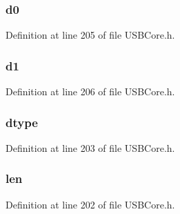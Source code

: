 \subsubsection[{d0}]{ d0}\label{struct_c_d_c_c_s_interface_descriptor_a3e359aaf0f33f4eeedb3f26e73ac1cc7}


Definition at line 205 of file U\+S\+B\+Core.\+h.

\hypertarget{struct_c_d_c_c_s_interface_descriptor_ac1f3ea17c85c96dbc7ec1dba968be24f}{}
\subsubsection[{d1}]{ d1}\label{struct_c_d_c_c_s_interface_descriptor_ac1f3ea17c85c96dbc7ec1dba968be24f}


Definition at line 206 of file U\+S\+B\+Core.\+h.

\hypertarget{struct_c_d_c_c_s_interface_descriptor_a0bb419531ec75697e63e9109fecf81b0}{}
\subsubsection[{dtype}]{ dtype}\label{struct_c_d_c_c_s_interface_descriptor_a0bb419531ec75697e63e9109fecf81b0}


Definition at line 203 of file U\+S\+B\+Core.\+h.

\hypertarget{struct_c_d_c_c_s_interface_descriptor_afbf3f3230446569534d5f466aaf4c23b}{}
\subsubsection[{len}]{ len}\label{struct_c_d_c_c_s_interface_descriptor_afbf3f3230446569534d5f466aaf4c23b}


Definition at line 202 of file U\+S\+B\+Core.\+h.

